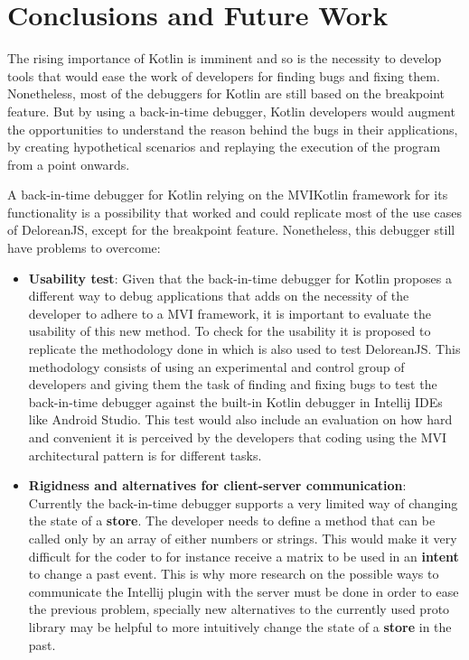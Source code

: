 \chapter{Conclusions and Future Work}
\label{cha:conclusions}

The rising importance of Kotlin is imminent and so is the necessity to develop tools that would ease the work of developers for finding bugs and fixing them. Nonetheless, most of the debuggers for Kotlin are still based on the breakpoint feature. But by using a back-in-time debugger, Kotlin developers would augment the opportunities to understand the reason behind the bugs in their applications, by creating hypothetical scenarios and replaying the execution of the program from a point onwards.

A back-in-time debugger for Kotlin relying on the MVIKotlin framework for its functionality is a possibility that worked and could replicate most of the use cases of DeloreanJS, except for the breakpoint feature. Nonetheless, this debugger still have problems to overcome:

\begin{itemize}
\item \textbf{Usability test}: Given that the back-in-time debugger for Kotlin proposes a different way to debug applications that adds on the necessity of the developer to adhere to a MVI framework, it is important to evaluate the usability of this new method. To check for the usability it is proposed to replicate the methodology done in which is also used to test DeloreanJS. This methodology consists of using an experimental and control group of developers and giving them the task of finding and fixing bugs to test the back-in-time debugger against the built-in Kotlin debugger in Intellij IDEs like Android Studio. This test would also include an evaluation on how hard and convenient it is perceived by the developers that coding using the MVI architectural pattern is for different tasks.
\item \textbf{Rigidness and alternatives for client-server communication}: Currently the back-in-time debugger supports a very limited way of changing the state of a \textbf{store}. The developer needs to define a method that can be called only by an array of either numbers or strings. This would make it very difficult for the coder to for instance receive a matrix to be used in an \textbf{intent} to change a past event. This is why more research on the possible ways to communicate the Intellij plugin with the server must be done in order to ease the previous problem, specially new alternatives to the currently used proto library may be helpful to more intuitively change the state of a \textbf{store} in the past.
\end{itemize}